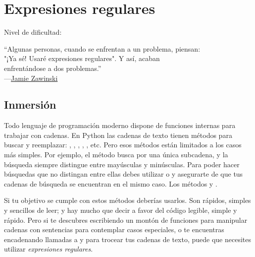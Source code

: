
\chapter{Expresiones regulares}\label{ch:expresionesregulares}

\noindent
Nivel de dificultad:\diflll

\begin{citaCap}
``Algunas personas, cuando se enfrentan a un problema, piensan: \\
"¡Ya sé! Usaré expresiones regulares". Y así, acaban \\
enfrentándose a dos problemas.'' \\
---\href{http://www.jwz.org/hacks/marginal.html}{Jamie Zawinski}
\end{citaCap}

\section{Inmersión}

Todo lenguaje de programación moderno dispone de funciones internas para trabajar con cadenas. En Python las cadenas de texto tienen métodos para buscar y reemplazar: , , , , , etc. Pero esos métodos están limitados a los casos más simples. Por ejemplo, el método  busca por una única subcadena, y la búsqueda siempre distingue entre mayúsculas y minúsculas. Para poder hacer búsquedas que no distingan entre ellas debes utilizar  o  y asegurarte de que tus cadenas de búsqueda se encuentran en el mismo caso. Los métodos  y .

Si tu objetivo se cumple con estos métodos deberías usarlos. Son rápidos, simples y sencillos de leer; y hay mucho que decir a favor del código legible, simple y rápido. Pero si te descubres escribiendo un montón de funciones para manipular cadenas con sentencias  para contemplar casos especiales, o te encuentras encadenando llamadas a  y  para trocear tus cadenas de texto, puede que necesites utilizar \emph{expresiones regulares}.

